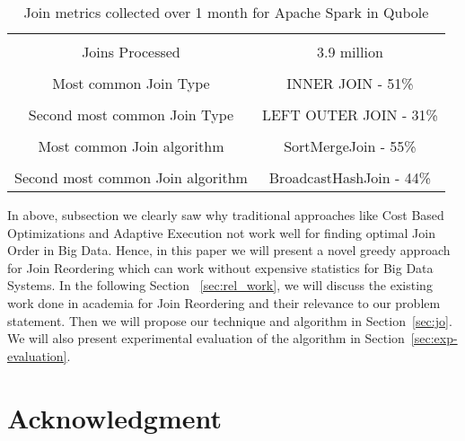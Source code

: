 \documentclass[conference]{IEEEtran}
\begin{document}
\begin{table}[h]
\begin{center}
\begin{tabular}{ |c|c| }
 \hline \\
Joins Processed & 3.9 million \\ \hline \\
Most common Join Type & INNER JOIN - 51\%  \\  \hline \\
Second most common Join Type &  LEFT OUTER JOIN - 31\%\\ \hline  \\
Most common Join algorithm & SortMergeJoin - 55\%\\ \hline \\
Second most common Join algorithm & BroadcastHashJoin - 44\%\\
 \hline
\end{tabular}
\label{tab:stats}
\end{center}
\caption{Join metrics collected over 1 month for Apache Spark in Qubole}
\end{table}




In above, subsection we clearly saw why traditional approaches like Cost Based Optimizations and Adaptive Execution not work well for finding optimal Join Order in Big Data. Hence, in this paper we will present a novel greedy approach for Join Reordering which can work without expensive statistics for Big Data Systems.
In the following Section ~\ref{sec:rel_work}, we will discuss the existing work done in academia for Join Reordering and their relevance to our problem statement. Then we will propose our technique and algorithm in Section~\ref{sec:jo}. We will also present experimental evaluation of the algorithm in Section~\ref{sec:exp-evaluation}.





\section*{Acknowledgment}
\end{document}
